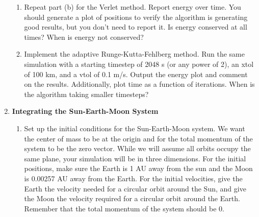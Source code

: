 \documentclass{article}
\begin{document}
\begin{enumerate}
\begin{enumerate}
		\item Repeat part (b) for the Verlet method. Report energy over time. You should generate a plot of positions to verify the algorithm is generating good results, but you don't need to report it. Is energy conserved at all times? When is energy not conserved?
		
		\item Implement the adaptive Runge-Kutta-Fehlberg method. Run the same simulation with a starting timestep of 2048 s (or any power of 2), an xtol of 100 km, and a vtol of 0.1 m/s. Output the energy plot and comment on the results. Additionally, plot time as a function of iterations. When is the algorithm taking smaller timesteps?
	\end{enumerate}

	\item \textbf{Integrating the Sun-Earth-Moon System}
	
	\begin{enumerate}
		\item Set up the initial conditions for the Sun-Earth-Moon system. We want the center of mass to be at the origin and for the total momentum of the system to be the zero vector. While we will assume all orbits occupy the same plane, your simulation will be in three dimensions. For the initial positions, make sure the Earth is 1 AU away from the sun and the Moon is 0.00257 AU away from the Earth. For the initial velocities, give the Earth the velocity needed for a circular orbit around the Sun, and give the Moon the velocity required for a circular orbit around the Earth. Remember that the total momentum of the system should be 0.
	\end{enumerate}
\end{enumerate}
\end{document}
